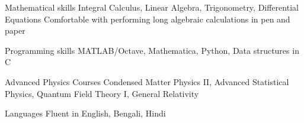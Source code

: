 

\begin{cvskills}


  
  \cvskill
	{Mathematical skills} %
	{Integral Calculus, Linear Algebra, Trigonometry, Differential Equations}
  \cvskill
	{}
	{Comfortable with performing long algebraic calculations in pen and paper} %

  \cvskill
    {Programming skills} %
    {MATLAB/Octave, Mathematica, Python, Data structures in C} %

  \cvskill
{Advanced Physics Courses} %
{Condensed Matter Physics II, Advanced Statistical Physics, Quantum Field Theory I, General Relativity} %

  \cvskill
    {Languages} %
    {Fluent in English, Bengali, Hindi} %

\end{cvskills}
